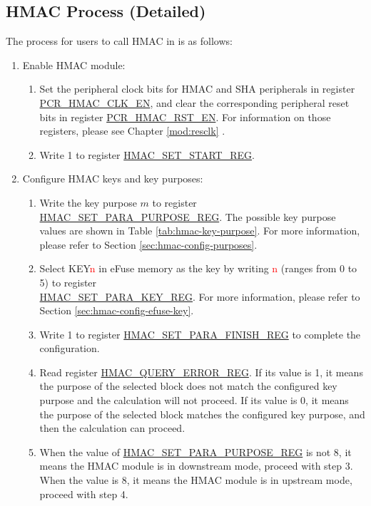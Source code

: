 \documentclass[main\_\_EN.tex]{subfiles}
\begin{document}
\subsection{HMAC Process (Detailed)}
\label{sec:hmac-process-detailed}
The process for users to call HMAC in \chipname{} is as follows:

\begin{enumerate}
    \item Enable HMAC module:
    \begin{enumerate}
        \item Set the peripheral clock bits for HMAC and SHA peripherals in register \hyperref[fielddesc:PCRHMACCLKEN]{PCR\_HMAC\_CLK\_EN}, and clear the corresponding peripheral reset bits in register \hyperref[fielddesc:PCRHMACRSTEN]{PCR\_HMAC\_RST\_EN}. For information on those registers, please see Chapter \ref{mod:resclk} \textit{}.
        \item Write 1 to register \hyperref[regdesc:HMACSETSTARTREG]{HMAC\_SET\_START\_REG}.
    \end{enumerate}

    \item Configure HMAC keys and key purposes:
    \begin{enumerate}
        \item Write the key purpose \begin{math}m\end{math} to register \hyperref[regdesc:HMACSETPARAPURPOSEREG]{HMAC\_SET\_PARA\_PURPOSE\_REG}. The possible key purpose values are shown in Table \ref{tab:hmac-key-purpose}. For more information, please refer to Section \ref{sec:hmac-config-purposes}.
        \item Select KEY\textcolor{red}{n} in eFuse memory as the key by writing \textcolor{red}{n} (ranges from 0 to 5) to register\\ \hyperref[regdesc:HMACSETPARAKEYREG]{HMAC\_SET\_PARA\_KEY\_REG}. For more information, please refer to Section \ref{sec:hmac-config-efuse-key}.
        \item Write 1 to register \hyperref[regdesc:HMACSETPARAFINISHREG]{HMAC\_SET\_PARA\_FINISH\_REG} to complete the configuration.
        \item Read register \hyperref[regdesc:HMACQUERYERRORREG]{HMAC\_QUERY\_ERROR\_REG}. If its value is 1, it means the purpose of the selected block does not match the configured key purpose and the calculation will not proceed. If its value is 0, it means the purpose of the selected block matches the configured key purpose, and then the calculation can proceed.
        \item When the value of \hyperref[regdesc:HMACSETPARAPURPOSEREG]{HMAC\_SET\_PARA\_PURPOSE\_REG} is not 8, it means the HMAC module is in downstream mode, proceed with step 3. When the value is 8, it means the HMAC module is in upstream mode, proceed with step 4.
    \end{enumerate}


\end{enumerate}
\end{document}
